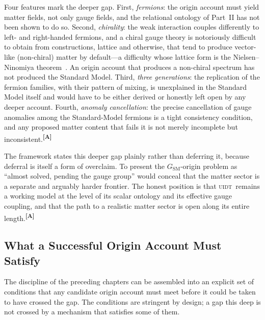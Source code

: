 \documentclass[12pt,a4paper,twoside]{article}
\theoremstyle{plain}
\theoremstyle{definition}
\theoremstyle{remark}
\newcommand{\UIDT}{\textsc{uidt}}
\newcommand{\catmark}[1]{\textsuperscript{\textsf{\textbf{[#1]}}}}
\begin{document}
Four features mark the deeper gap. First, \emph{fermions}: the origin account must yield matter fields, not only gauge fields, and the relational ontology of Part~II has not been shown to do so. Second, \emph{chirality}: the weak interaction couples differently to left- and right-handed fermions, and a chiral gauge theory is notoriously difficult to obtain from constructions, lattice and otherwise, that tend to produce vector-like (non-chiral) matter by default---a difficulty whose lattice form is the Nielsen--Ninomiya theorem~\cite{nielsen1981}. An origin account that produces a non-chiral spectrum has not produced the Standard Model. Third, \emph{three generations}: the replication of the fermion families, with their pattern of mixing, is unexplained in the Standard Model itself and would have to be either derived or honestly left open by any deeper account. Fourth, \emph{anomaly cancellation}: the precise cancellation of gauge anomalies among the Standard-Model fermions is a tight consistency condition, and any proposed matter content that fails it is not merely incomplete but inconsistent.\catmark{A}

The framework states this deeper gap plainly rather than deferring it, because deferral is itself a form of overclaim. To present the $G_{\mathrm{SM}}$-origin problem as ``almost solved, pending the gauge group'' would conceal that the matter sector is a separate and arguably harder frontier. The honest position is that \UIDT\ remains a working model at the level of its scalar ontology and its effective gauge coupling, and that the path to a realistic matter sector is open along its entire length.\catmark{A}

\subsection{What a Successful Origin Account Must Satisfy}
\label{subsec:success-criteria}

The discipline of the preceding chapters can be assembled into an explicit set of conditions that any candidate origin account must meet before it could be taken to have crossed the gap. The conditions are stringent by design; a gap this deep is not crossed by a mechanism that satisfies some of them.
\end{document}
